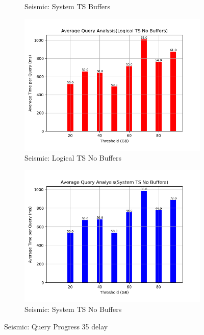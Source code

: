 \begin{figure}
\begin{subfigure}[c]{0.45\textwidth}
		\caption{Seismic: System TS Buffers}
		\label{fig:system-ts-35-seismic}
	\end{subfigure}
	\begin{subfigure}[c]{0.45\textwidth}
		\includegraphics[width=1\textwidth]	 {figures/Experiments/Dynamic/SEISMIC/batch_answering/35/average_query_time_per_batch_version_999777016_10485760_10_delay[35].png}
		\caption{Seismic: Logical TS No Buffers}
		\label{fig:logical-ts-no-35-seismic}
	\end{subfigure}
	\begin{subfigure}[c]{0.45\textwidth}
		\includegraphics[width=1\textwidth]	 {figures/Experiments/Dynamic/SEISMIC/batch_answering/35/average_query_time_per_batch_version_999777017_10485760_10_delay[35].png}
		\caption{Seismic: System TS No Buffers}
		\label{fig:system-ts-no-35-seismic}
	\end{subfigure}
	\caption{Seismic: Query Progress 35 delay}
	\label{fig:query-progress-35-seismic}
\end{figure}
